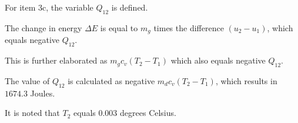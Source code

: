 For item 3c, the variable \( Q_{12} \) is defined.

The change in energy \( \Delta E \) is equal to \( m_g \) times the difference \( (u_2 - u_1) \), which equals negative \( Q_{12} \).

This is further elaborated as \( m_g c_v (T_2 - T_1) \) which also equals negative \( Q_{12} \).

The value of \( Q_{12} \) is calculated as negative \( m_d c_v (T_2 - T_1) \), which results in \( 1674.3 \) Joules.

It is noted that \( T_2 \) equals \( 0.003 \) degrees Celsius.